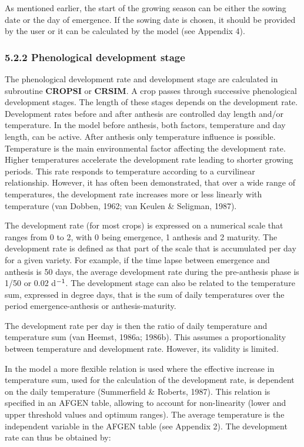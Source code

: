 \documentclass[11pt]{article}
\begin{document}
\bigskip
As mentioned earlier, the start of the growing season can be either the sowing date or the
day of emergence. If the sowing date is chosen, it should be provided by the user or it
can be calculated by the model (see Appendix 4).

\bigskip
\bigskip

\subsubsection{  5.2.2 Phenological development stage  }

The phenological development rate and development stage are calculated in subrou\-tine
{\bf CROPSI} or {\bf CRSIM}. A crop passes through successive phenological development stages.
The length of these stages depends on the development rate. Development rates before
and after anthesis are controlled day length and/or tempera\-ture. In the model before
anthesis, both factors, temperature and day length, can be active. After anthesis only
temperature influence is possible.\\
Temperature is the main environmental factor affecting the development rate. Higher
temperatures accelerate the development rate leading to shorter growing periods. This rate
responds to temperature according to a curvilinear relationship. However, it has often
been demonstrated, that over a wide range of temperatures, the develop\-ment rate
increases more or less linearly with temperature (van Dobben, 1962; van Keulen \&
Seligman, 1987).

\bigskip
 The development rate (for most crops) is expressed on a numerical scale that ranges from
0 to 2, with 0 being emergence, 1 anthesis and 2 maturity. The development rate is
defined as that part of the scale that is accumulated per day for a given variety. For
example, if the time lapse between emergence and anthesis is 50 days, the average
development rate during the pre-anthesis phase is 1/50 or 0.02 d$^{{\rm -1}}$. The development stage
can also be related to the temperature sum, expressed in degree days, that is the sum of
daily temperatures over the period emergence-anthesis or anthesis-maturity. 

\bigskip
The develop\-ment rate per day is then the ratio of daily temperature and temperature sum
(van Heemst, 1986a; 1986b). This assumes a propor\-tionality between tempera\-ture and
develop\-ment rate. Howev\-er, its validity is limited.

\bigskip
In the model a more flexible relation is used where the effective increase in tempera\-ture
sum, used for the calculation of the development rate, is dependent on the daily tempera\-ture (Summerfield \& Roberts, 1987). This relation is specified in an AFGEN table, 
allowing to account for non-linearity (lower and upper threshold values and optimum
ranges). The average temperature is the independent variable in the AFGEN table (see
Appendix 2). The development rate can thus be obtained by:
\end{document}
